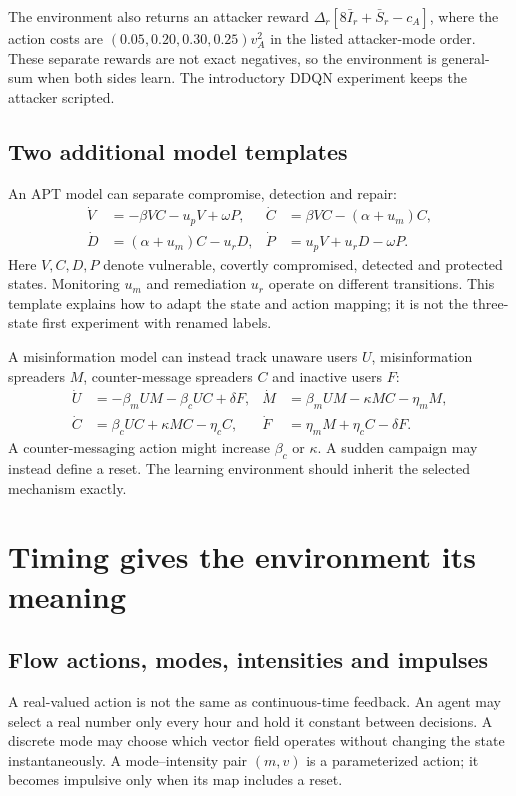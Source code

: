 \documentclass[11pt,a4paper]{article}
\theoremstyle{definition}
\theoremstyle{remark}
\begin{document}
The environment also returns an attacker reward
$\Delta_r[8\bar I_r+\bar S_r-c_A]$, where the action costs are $(0.05,0.20,0.30,0.25)v_A^2$ in the listed attacker-mode order. These separate rewards are not exact negatives, so the environment is general-sum when both sides learn. The introductory DDQN experiment keeps the attacker scripted.

\subsection{Two additional model templates}
An APT model can separate compromise, detection and repair:
\begin{align}
\dot V&=-\beta VC-u_pV+\omega P, &
\dot C&=\beta VC-(\alpha+u_m)C,\nonumber\\
\dot D&=(\alpha+u_m)C-u_rD, &
\dot P&=u_pV+u_rD-\omega P.\label{eq:apt}
\end{align}
Here $V,C,D,P$ denote vulnerable, covertly compromised, detected and protected states. Monitoring $u_m$ and remediation $u_r$ operate on different transitions. This template explains how to adapt the state and action mapping; it is not the three-state first experiment with renamed labels.

A misinformation model can instead track unaware users $U$, misinformation spreaders $M$, counter-message spreaders $C$ and inactive users $F$:
\begin{align}
\dot U&=-\beta_mUM-\beta_cUC+\delta F, &
\dot M&=\beta_mUM-\kappa MC-\eta_mM,\nonumber\\
\dot C&=\beta_cUC+\kappa MC-\eta_cC, &
\dot F&=\eta_mM+\eta_cC-\delta F.
\end{align}
A counter-messaging action might increase $\beta_c$ or $\kappa$. A sudden campaign may instead define a reset. The learning environment should inherit the selected mechanism exactly.

\section{Timing gives the environment its meaning}
\subsection{Flow actions, modes, intensities and impulses}
A real-valued action is not the same as continuous-time feedback. An agent may select a real number only every hour and hold it constant between decisions. A discrete mode may choose which vector field operates without changing the state instantaneously. A mode--intensity pair $(m,v)$ is a parameterized action; it becomes impulsive only when its map includes a reset.
\end{document}
